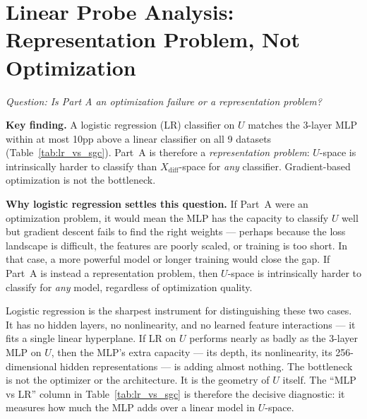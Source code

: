 \documentclass[11pt]{article}
\begin{document}
\section{Linear Probe Analysis: Representation Problem, Not Optimization}
\textit{Question: Is Part A an optimization failure or a representation problem?}
\label{sec:linear_probe}

\noindent\textbf{Key finding.}
A logistic regression (LR) classifier on $U$ matches the 3-layer MLP within
at most 10pp above a linear classifier on all 9 datasets (Table~\ref{tab:lr_vs_sgc}).  Part~A is therefore a
\emph{representation problem}: $U$-space is intrinsically harder to classify than
$X_{\mathrm{diff}}$-space for \emph{any} classifier.  Gradient-based optimization
is not the bottleneck.

\noindent\textbf{Why logistic regression settles this question.}
If Part~A were an optimization problem, it would mean the MLP has the capacity to
classify $U$ well but gradient descent fails to find the right weights --- perhaps
because the loss landscape is difficult, the features are poorly scaled, or training
is too short.  In that case, a more powerful model or longer training would close
the gap.  If Part~A is instead a representation problem, then $U$-space is
intrinsically harder to classify for \emph{any} model, regardless of optimization
quality.

Logistic regression is the sharpest instrument for distinguishing these two cases.
It has no hidden layers, no nonlinearity, and no learned feature interactions --- it
fits a single linear hyperplane.  If LR on $U$ performs nearly as badly as the 3-layer
MLP on $U$, then the MLP's extra capacity --- its depth, its nonlinearity, its
256-dimensional hidden representations --- is adding almost nothing.  The bottleneck
is not the optimizer or the architecture.  It is the geometry of $U$ itself.
The ``MLP vs LR'' column in Table~\ref{tab:lr_vs_sgc} is therefore the decisive
diagnostic: it measures how much the MLP adds over a linear model in $U$-space.
\end{document}
